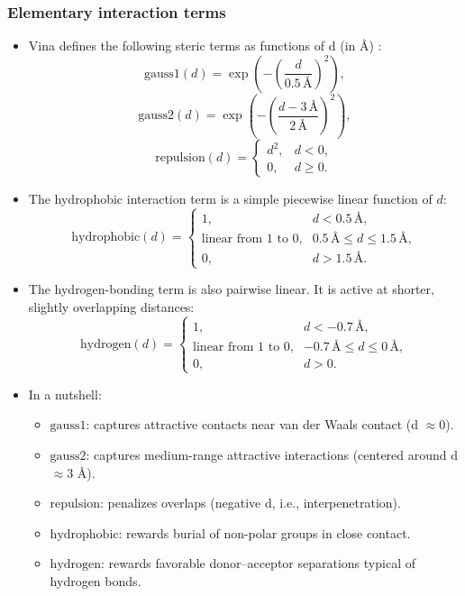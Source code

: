 \documentclass[12pt, a4paper]{article}
\begin{document}
\subsubsection{Elementary interaction terms}
\begin{itemize}
\item Vina defines the following steric terms as functions of d (in \r{A}) :
\[
  \text{gauss1}(d) = \exp\!\left( - \left( \frac{d}{0.5 \,\text{\AA}} \right)^{2} \right),
\]
\[
  \text{gauss2}(d) = \exp\!\left( - \left( \frac{d - 3 \,\text{\AA}}{2 \,\text{\AA}} \right)^{2} \right),
\]
\[
  \text{repulsion}(d) =
  \begin{cases}
    d^{2}, & d < 0, \\
    0,     & d \ge 0.
  \end{cases}
\]

\item The hydrophobic interaction term is a simple piecewise linear function of \( d \):
\[
  \text{hydrophobic}(d) =
  \begin{cases}
    1, & d < 0.5 \,\text{\AA}, \\
    \text{linear from 1 to 0}, & 0.5 \,\text{\AA} \le d \le 1.5 \,\text{\AA}, \\
    0, & d > 1.5 \,\text{\AA}.
  \end{cases}
\]

\item The hydrogen-bonding term is also pairwise linear. It is active at shorter, slightly overlapping distances:
\[
  \text{hydrogen}(d) =
  \begin{cases}
    1, & d < -0.7 \,\text{\AA}, \\
    \text{linear from 1 to 0}, & -0.7 \,\text{\AA} \le d \le 0 \,\text{\AA}, \\
    0, & d > 0.
  \end{cases}
\]

\item In a nutshell:
\begin{itemize}
  \item $\text{gauss1}$: captures attractive contacts near van der Waals contact (d $\approx 0$).
  \item $\text{gauss2}$: captures medium-range attractive interactions (centered around d $\approx 3$ \r{A}).
  \item $\text{repulsion}$: penalizes overlaps (negative d, i.e., interpenetration).
  \item $\text{hydrophobic}$: rewards burial of non-polar groups in close contact.
  \item $\text{hydrogen}$: rewards favorable donor–acceptor separations typical of hydrogen bonds.
\end{itemize}
\end{itemize}
\end{document}
